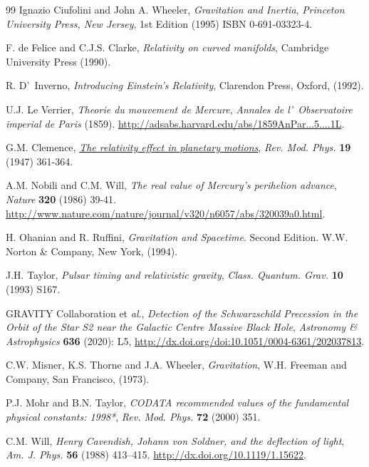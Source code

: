\begin{thebibliography}{99}
 Ignazio Ciufolini and John A. Wheeler,  \textit{Gravitation and Inertia},
  \textsl{Princeton University Press, New Jersey}, 1st Edition (1995) ISBN 0-691-03323-4.

 F. de Felice and C.J.S. Clarke,  \textit{Relativity on curved manifolds}, Cambridge University Press (1990).

 R. D'~Inverno,  \textit{Introducing Einstein's Relativity}, Clarendon Press, Oxford, (1992).




 U.J. Le Verrier,  \textit{Theorie du mouvement de Mercure},   \textsl{Annales de l'\ Observatoire imperial de Paris}  (1859). \url{http://adsabs.harvard.edu/abs/1859AnPar...5....1L}.

 G.M. Clemence, \href{http://rmp.aps.org/abstract/RMP/v19/i4/p361_1} \textit{The relativity effect in planetary motions},   \textsl{Rev. Mod. Phys.}   \textbf{19} (1947) 361-364.

 A.M. Nobili and C.M. Will,  \textit{The real value of Mercury's perihelion advance},   \textsl{Nature}   \textbf{320} (1986) 39-41. \url{http://www.nature.com/nature/journal/v320/n6057/abs/320039a0.html}.

 H. Ohanian and R. Ruffini,  \textit{Gravitation and Spacetime}. Second Edition. W.W. Norton \& Company, New York, (1994).

 J.H. Taylor,  \textit{Pulsar timing and relativistic gravity},   \textsl{Class. Quantum. Grav.}   \textbf{10}  (1993) S167.

 GRAVITY Collaboration et \textit{al}., \textit{Detection of the Schwarzschild Precession in the Orbit of the Star S2 near the Galactic Centre Massive Black Hole},   \textsl{Astronomy \& Astrophysics} \textbf{636} (2020): L5, \url{http://dx.doi.org/doi:10.1051/0004-6361/202037813}.

 C.W. Misner, K.S. Thorne and J.A. Wheeler,  \textit{Gravitation},
W.H. Freeman and Company, San Francisco, (1973).

P.J. Mohr and B.N. Taylor,  \textit{CODATA recommended values of
the fundamental physical constants: 1998*},   \textsl{Rev. Mod. Phys.}   \textbf{72}
(2000) 351.

 C.M. Will,  \textit{Henry Cavendish, Johann von Soldner, and the deflection of light},    \textsl{Am. J. Phys.}   \textbf{ 56} (1988) 413--415. \url{http://dx.doi.org/10.1119/1.15622}.


\end{thebibliography}
